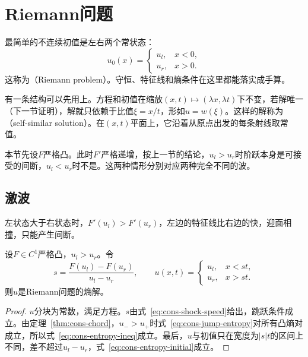 \section{Riemann问题}
\label{sec:cons-riemann}

最简单的不连续初值是左右两个常状态：
\begin{equation}
  u_0(x)=\begin{cases}u_l,&x<0,\\u_r,&x>0.\end{cases}
  \label{eq:cons-riemann-data}
\end{equation}
这称为（Riemann problem）。守恒、特征线和熵条件在这里都能落实成手算。

有一条结构可以先用上。方程和初值在缩放$(x,t)\mapsto(\lambda x,\lambda t)$下不变，若解唯一（下一节证明），解就只依赖于比值$\xi=x/t$，形如$u=w(\xi)$。这样的解称为（self-similar solution）。在$(x,t)$平面上，它沿着从原点出发的每条射线取常值。

本节先设$F$严格凸。此时$F'$严格递增，按上一节的结论，$u_l>u_r$时阶跃本身是可接受的间断，$u_l<u_r$时不是。这两种情形分别对应两种完全不同的波。

\subsection{激波}
\label{subsec:cons-shock}

左状态大于右状态时，$F'(u_l)>F'(u_r)$，左边的特征线比右边的快，迎面相撞，只能产生间断。

\begin{theorem}[激波解]
\label{thm:cons-shock}
设$F\in C^1$严格凸，$u_l>u_r$。令
\begin{equation}
  s=\frac{F(u_l)-F(u_r)}{u_l-u_r},\qquad
  u(x,t)=\begin{cases}u_l,&x<st,\\u_r,&x>st.\end{cases}
  \label{eq:cons-shock-solution}
\end{equation}
则$u$是Riemann问题的熵解。
\end{theorem}

\begin{proof}
$u$分块为常数，满足方程。$s$由式~\eqref{eq:cons-shock-speed}给出，跳跃条件成立。由定理~\ref{thm:cons-chord}，$u_->u_+$时式~\eqref{eq:cons-jump-entropy}对所有凸熵对成立，所以式~\eqref{eq:cons-entropy-ineq}成立。最后，$u$与初值只在宽度为$\lvert s\rvert t$的区间上不同，差不超过$u_l-u_r$，式~\eqref{eq:cons-entropy-initial}成立。
\end{proof}

